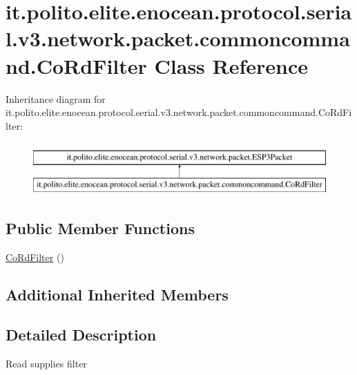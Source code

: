 \hypertarget{classit_1_1polito_1_1elite_1_1enocean_1_1protocol_1_1serial_1_1v3_1_1network_1_1packet_1_1commoncommand_1_1_co_rd_filter}{}\section{it.\+polito.\+elite.\+enocean.\+protocol.\+serial.\+v3.\+network.\+packet.\+commoncommand.\+Co\+Rd\+Filter Class Reference}
\label{classit_1_1polito_1_1elite_1_1enocean_1_1protocol_1_1serial_1_1v3_1_1network_1_1packet_1_1commoncommand_1_1_co_rd_filter}
Inheritance diagram for it.\+polito.\+elite.\+enocean.\+protocol.\+serial.\+v3.\+network.\+packet.\+commoncommand.\+Co\+Rd\+Filter\+:\begin{figure}[H]
\begin{center}
\leavevmode
\includegraphics[height=2.000000cm]{classit_1_1polito_1_1elite_1_1enocean_1_1protocol_1_1serial_1_1v3_1_1network_1_1packet_1_1commoncommand_1_1_co_rd_filter}
\end{center}
\end{figure}
\subsection*{Public Member Functions}
\begin{DoxyCompactItemize}
\item 
\hyperlink{classit_1_1polito_1_1elite_1_1enocean_1_1protocol_1_1serial_1_1v3_1_1network_1_1packet_1_1commoncommand_1_1_co_rd_filter_ae7f75633487b852cd17112e5e8158cc6}{Co\+Rd\+Filter} ()
\end{DoxyCompactItemize}
\subsection*{Additional Inherited Members}


\subsection{Detailed Description}
Read supplies filter


